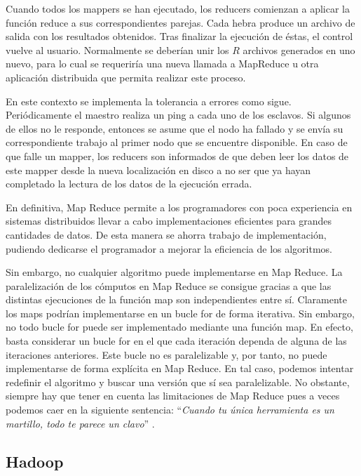 \documentclass[10pt]{article}
\begin{document}
		Cuando todos los mappers se han ejecutado, los reducers comienzan a aplicar la función reduce a sus correspondientes parejas. Cada hebra produce un archivo de salida con los resultados obtenidos. Tras finalizar la ejecución de éstas, el control vuelve al usuario. Normalmente se deberían unir los $R$ archivos generados en uno nuevo, para lo cual se requeriría una nueva llamada a MapReduce u otra aplicación distribuida que permita realizar este proceso.

		En este contexto se implementa la tolerancia a errores como sigue. Periódicamente el maestro realiza un ping a cada uno de los esclavos. Si algunos de ellos no le responde, entonces se asume que el nodo ha fallado y se envía su correspondiente trabajo al primer nodo que se encuentre disponible. En caso de que falle un mapper, los reducers son informados de que deben leer los datos de este mapper desde la nueva localización en disco a no ser que ya hayan completado la lectura de los datos de la ejecución errada.

		En definitiva, Map Reduce permite a los programadores con poca experiencia en sistemas distribuidos llevar a cabo implementaciones eficientes para grandes cantidades de datos. De esta manera se ahorra trabajo de implementación, pudiendo dedicarse el programador a mejorar la eficiencia de los algoritmos.
		
		Sin embargo, no cualquier algoritmo puede implementarse en Map Reduce. La paralelización de los cómputos en Map Reduce se consigue gracias a que las distintas ejecuciones de la función map son independientes entre sí. Claramente los maps podrían implementarse en un bucle for de forma iterativa. Sin embargo, no todo bucle for puede ser implementado mediante una función map. En efecto, basta considerar un bucle for en el que cada iteración dependa de alguna de las iteraciones anteriores. Este bucle no es paralelizable y, por tanto, no puede implementarse de forma explícita en Map Reduce. En tal caso, podemos intentar redefinir el algoritmo y buscar una versión que sí sea paralelizable. No obstante, siempre hay que tener en cuenta las limitaciones de Map Reduce pues a veces podemos caer en la siguiente sentencia: ``\textit{Cuando tu única herramienta es un martillo, todo te parece un clavo}'' \cite{hadoop-cons}.


	\subsection{Hadoop} \label{sec:mr-hadoop:hadoop}
\end{document}

